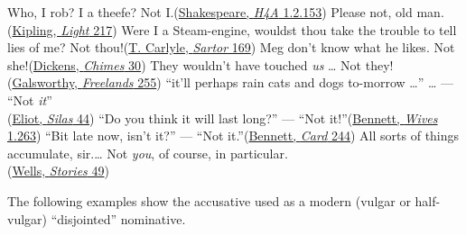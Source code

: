 \ea \label{ex:05-118}
\ea Who, I rob? I a theefe? Not I.\hfill(\href{https://internetshakespeare.uvic.ca/doc/1H4_F1/scene/1.2/index.html#tln-240}{Shakespeare, \textit{H4A} 1.2.153}) 
\ex Please not, old man.\hfill(\href{https://archive.org/details/lightthatfailed0000rudy_q6g8/page/228/mode/2up?q=%22please+not%2C+old+man%22&view=theater}{Kipling, \textit{Light} 217})
\ex Were I a Steam-engine, wouldst thou take the trouble to tell lies of me? Not thou!\hfill(\href{https://archive.org/details/sartorresartus02unkngoog/page/222/mode/2up?view=theater&q=%22were+I+a+steam-engine%22}{T. Carlyle, \textit{Sartor} 169})
\ex Meg don't know what he likes. Not she!\hfill(\href{https://archive.org/details/chimes00dick/page/58/mode/2up?q=%22meg+don%27t+know+what%22&view=theater}{Dickens, \textit{Chimes} 30})
\ex They wouldn't have touched \textit{us} {\dots} Not they!\\\hfill(\href{https://archive.org/details/freelands00galsrich/page/222/mode/2up?q=%22not+they%21%22&view=theater}{Galsworthy, \textit{Freelands} 255}) %
\ex ``it'll perhaps rain cats and dogs to-morrow {\dots}'' {\dots} --- ``Not \textit{it}''\\\hfill(\href{https://archive.org/details/silasmarnerbygeo00elio/page/30/mode/2up?q=%22cats+and+dogs%22&view=theater}{Eliot, \textit{Silas} 44})
\ex ``Do you think it will last long?'' --- ``Not it!''\hfill(\href{https://archive.org/details/cu31924013586940/page/238/mode/2up?q=%22will+last+long%22&view=theater}{Bennett, \textit{Wives} 1.263})
\ex ``Bit late now, isn't it?'' --- ``Not it.''\hfill(\href{https://archive.org/details/cardstoryofadven00bennuoft/page/244/mode/2up?view=theater&q=%22bit+late+now%22}{Bennett, \textit{Card} 244}) %
\ex All sorts of things accumulate, sir.{\dots} Not \textit{you}, of course, in particular.\\\hfill(\href{https://archive.org/details/in.ernet.dli.2015.475865/page/n129/mode/2up?q=%22Not+you%2C+of+course%2C+in+particular.%22&view=theater}{Wells, \textit{Stories} 49}) %
\z
\z
{}

The following examples  show the accusative used as a modern (vulgar or half-vulgar) ``disjointed'' nominative.

